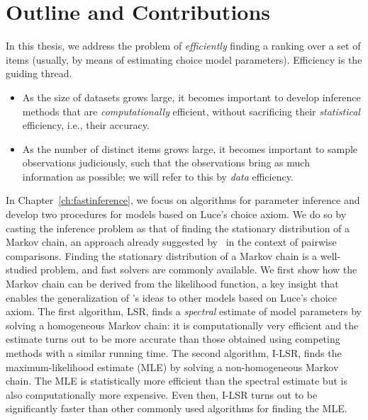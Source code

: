 \section{Outline and Contributions}
\label{in:sec:outline}

In this thesis, we address the problem of \emph{efficiently} finding a ranking over a set of items (usually, by means of estimating choice model parameters).
Efficiency is the guiding thread.
\begin{itemize}
\item As the size of datasets grows large, it becomes important to develop inference methods that are \emph{computationally} efficient, without sacrificing their \emph{statistical} efficiency, i.e., their accuracy.
\item As the number of distinct items grows large, it becomes important to sample observations judiciously, such that the observations bring as much information as possible; we will refer to this by \emph{data} efficiency.
\end{itemize}

In Chapter~\ref{ch:fastinference}, we focus on algorithms for parameter inference and develop two procedures for models based on Luce's choice axiom.
We do so by casting the inference problem as that of finding the stationary distribution of a Markov chain, an approach already suggested by~\citet{negahban2012iterative} in the context of pairwise comparisons.
Finding the stationary distribution of a Markov chain is a well-studied problem, and fast solvers are commonly available.
We first show how the Markov chain can be derived from the likelihood function, a key insight that enables the generalization of \citeauthor{negahban2012iterative}'s ideas to other models based on Luce's choice axiom.
The first algorithm, LSR, finds a \emph{spectral} estimate of model parameters by solving a homogeneous Markov chain: it is computationally very efficient and the estimate turns out to be more accurate than those obtained using competing methods with a similar running time.
The second algorithm, I-LSR, finds the maximum-likelihood estimate (MLE) by solving a non-homogeneous Markov chain.
The MLE is statistically more efficient than the spectral estimate but is also computationally more expensive.
Even then, I-LSR turns out to be significantly faster than other commonly used algorithms for finding the MLE.

